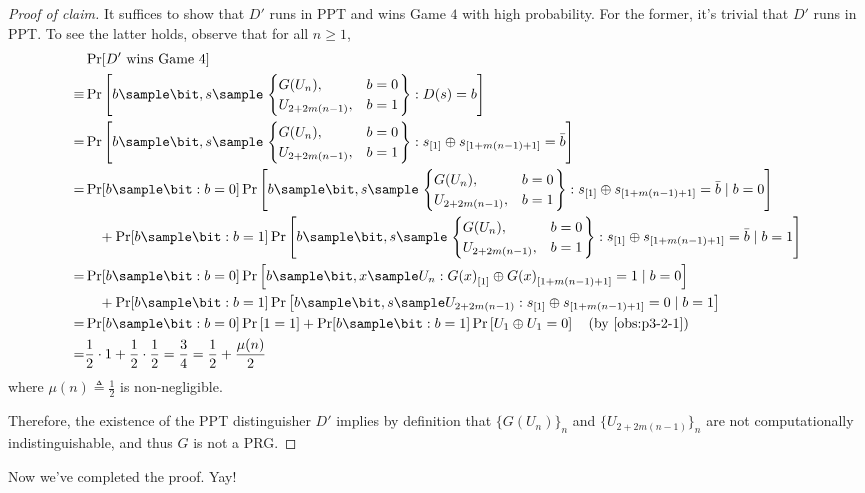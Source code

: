 \begin{answer}[ii]
\begin{proof}[Proof of claim]
    It suffices to show that $D'$ runs in PPT and wins Game $4$ with high probability. For the former, it's trivial that $D'$ runs in PPT. To see the latter holds, observe that for all $n\ge 1$,
    \begin{align*}
        &\Pr[D' \textrm{ wins Game } 4]\\
        \equiv& \Pr\left[b\sample\bit, s\sample \left.\begin{cases} 
                G(U_{n}), &b = 0 \\
                U_{2+2m(n-1)}, &b = 1 
            \end{cases}\right\} : D(s)=b \right] \\
        =& \Pr\left[b\sample\bit, s\sample \left.\begin{cases} 
                G(U_{n}), &b = 0 \\
                U_{2+2m(n-1)}, &b = 1 
            \end{cases}\right\} : s_{[1]}\oplus s_{[1+m(n-1)+1]}=\bar{b} \right] \\
        =& \Pr[b\sample\bit: b=0] \Pr\left[b\sample\bit, s\sample \left.\begin{cases} 
                G(U_{n}), &b = 0 \\
                U_{2+2m(n-1)}, &b = 1 
            \end{cases}\right\} : s_{[1]}\oplus s_{[1+m(n-1)+1]}=\bar{b} \mid b=0 \right] \\
        &\quad + \Pr[b\sample\bit: b=1] \Pr\left[b\sample\bit, s\sample \left.\begin{cases} 
                G(U_{n}), &b = 0 \\
                U_{2+2m(n-1)}, &b = 1 
            \end{cases}\right\} : s_{[1]}\oplus s_{[1+m(n-1)+1]}=\bar{b} \mid b=1 \right] \\
        =& \Pr[b\sample\bit: b=0] \Pr\left[b\sample\bit, x\sample U_{n} : {G(x)}_{[1]}\oplus {G(x)}_{[1+m(n-1)+1]} = 1 \mid b=0 \right] \\
        &\quad + \Pr[b\sample\bit: b=1] \Pr\left[b\sample\bit, s\sample U_{2+2m(n-1)}: s_{[1]}\oplus s_{[1+m(n-1)+1]} = 0 \mid b=1 \right] \\
        =& \Pr[b\sample\bit: b=0] \Pr\left[ 1=1  \right] 
        + \Pr[b\sample\bit: b=1] \Pr\left[ U_1\oplus U_1 = 0 \right] 
        \quad \textrm{(by \autoref{obs:p3-2-1})} \\
        =& \frac{1}{2} \cdot  1 + \frac{1}{2} \cdot \frac{1}{2}
        = \frac{3}{4} = \frac{1}{2}+\frac{\mu(n)}{2}
    \end{align*}
    where $\mu(n)\triangleq \frac{1}{2}$ is non-negligible.

    Therefore, the existence of the PPT distinguisher $D'$ implies by definition that $\{G(U_n)\}_n$ and $\{U_{2+2m(n-1)}\}_n$ are not computationally indistinguishable, and thus $G$ is not a PRG.
\end{proof}

Now we’ve completed the proof. Yay!
\end{answer}